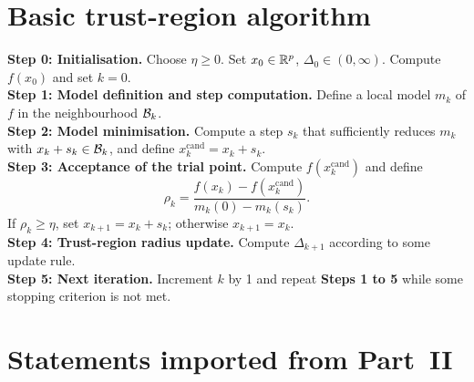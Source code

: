 \documentclass[11pt]{article}
\theoremstyle{plain}
\theoremstyle{definition}
\theoremstyle{remark}
\numberwithin{equation}{section}
\begin{document}


\appendix

\section{Basic trust-region algorithm} \label{app: BTR algorithm}

\begin{algorithm}[H]
    \small
    \SetAlgoLined
    \DontPrintSemicolon

    \textbf{Step 0: Initialisation.} Choose $\eta \geq 0$. Set $x_0 \in {\mathbb{R}}^p$, $\Delta_0 \in (0, \infty)$. Compute $f(x_0)$ and set $k = 0$. \; ~\\

    \textbf{Step 1: Model definition and step computation.} Define a local model $m_k$ of $f$ in the neighbourhood ${\mathcal{B}}_k$. \; ~\\

    \textbf{Step 2: Model minimisation.} Compute a step $s_k$ that sufficiently reduces $m_k$ with $x_k + s_k \in {\mathcal{B}}_k$, and define $x_k^{\mathrm{cand}} = x_k + s_k$. \; ~\\

    \textbf{Step 3: Acceptance of the trial point.} Compute $f(x_k^{\mathrm{cand}})$ and define
    \begin{equation}
        \rho_k = \frac{f(x_k) - f(x_k^{\mathrm{cand}})}{m_k(0) - m_k(s_k)}.
        \label{eqn:definition rho}
    \end{equation}
    If $\rho_k \geq \eta$, set $x_{k+1} = x_k + s_k$; otherwise $x_{k+1} = x_k$. \; ~\\

    \textbf{Step 4: Trust-region radius update.} Compute $\Delta_{k+1}$ according to some update rule. \; ~\\

    \textbf{Step 5: Next iteration.} Increment $k$ by 1 and repeat \textbf{Steps 1 to 5} while some stopping criterion is not met. \;

    \caption{Basic trust-region algorithm (BTR).}
    \label{alg:generic BTR}
\end{algorithm}




\section{Statements imported from Part~II}
\label{app: imported}
\end{document}
